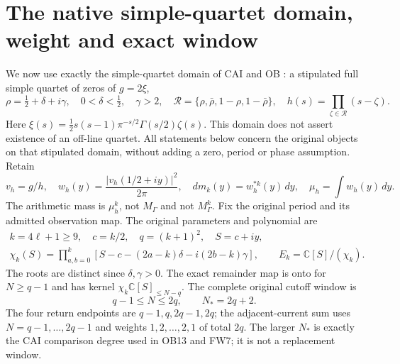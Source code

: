 \documentclass[11pt]{article}
\newcommand{\C}{\mathbb C}
\begin{document}
\section{The native simple-quartet domain, weight and exact window}

We now use exactly the simple-quartet domain of CAI and OB
\cite{CAI,OB}: a stipulated full simple quartet of zeros of $g=2\xi$,
\begin{equation}\label{eq:nativedomain}
 \rho=\tfrac12+\delta+i\gamma,\quad 0<\delta<\tfrac12,\quad\gamma>2,
 \quad \mathcal R=\{\rho,\bar\rho,1-\rho,1-\bar\rho\},
 \quad h(s)=\prod_{\zeta\in\mathcal R}(s-\zeta).
\end{equation}
Here $\xi(s)=\tfrac12s(s-1)\pi^{-s/2}\Gamma(s/2)\zeta(s)$.
This domain does not assert existence of an off-line quartet.
All statements below concern the original objects on that stipulated
domain, without adding a zero, period or phase assumption.
Retain
\begin{equation}\label{eq:nativeweight}
 v_h=g/h,\quad w_h(y)=\frac{|v_h(1/2+iy)|^2}{2\pi},\quad
 dm_k(y)=w_h^{*k}(y)\,dy,\quad
 \mu_h=\int w_h(y)\,dy.
\end{equation}
The arithmetic mass is $\mu_h^k$, not $M_\Gamma$ and not
$M_\Gamma^k$.  Fix the original period and its admitted observation map.
The original parameters and polynomial are
\begin{equation}\label{eq:chik}
 \begin{gathered}
 k=4\ell+1\ge9,\quad c=k/2,\quad q=(k+1)^2,\quad S=c+iy,\\
 \chi_k(S)=\prod_{a,b=0}^k
 [S-c-(2a-k)\delta-i(2b-k)\gamma],\qquad E_k=\C[S]/(\chi_k).
 \end{gathered}
\end{equation}
The roots are distinct since $\delta,\gamma>0$.  The exact remainder map
is onto for $N\ge q-1$ and has kernel $\chi_k\C[S]_{\le N-q}$.
The complete original cutoff window is
\begin{equation}\label{eq:window}
 q-1\le N\le2q,
 \qquad N_*=2q+2.
\end{equation}
The four return endpoints are $q-1,q,2q-1,2q$; the adjacent-current sum
uses $N=q-1,\ldots,2q-1$ and weights $1,2,\ldots,2,1$ of total $2q$.
The larger $N_*$ is exactly the CAI comparison degree used in OB13 and
FW7; it is not a replacement window.
\end{document}
